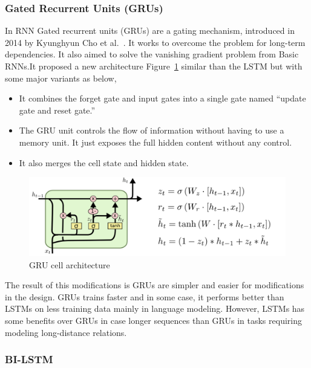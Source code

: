 \subsubsection{Gated Recurrent Units (GRUs)}

In RNN Gated recurrent units (GRUs) are a gating mechanism, introduced in 2014 by Kyunghyun Cho et al.~\cite{Cho_et_al}. It works to overcome the problem for long-term dependencies. It also aimed to solve the vanishing gradient problem from Basic RNNs.It proposed a new architecture Figure~\ref{fig:GRU} similar than the LSTM but with some major variants as below,
\begin{itemize}
  
\item It combines the forget gate and input gates into a single gate named “update gate and reset gate.”
\item The GRU unit controls the flow of information without having to use a memory unit. It just exposes the full hidden content without any control.
\item It also merges the cell state and hidden state.
  
\end{itemize}%
\begin{figure}[!t]
  \centering
  \includegraphics[scale=0.6]{./Figures/Ch_2_Background/GRU.png}
        \caption{GRU cell architecture~\cite{colah}}
        \label{fig:GRU}
      \end{figure}%
The result of this modifications is GRUs are simpler and easier for modifications in the design. GRUs trains faster and in some case, it performs better than LSTMs on less training data mainly in language modeling. However, LSTMs has some benefits over GRUs in case longer sequences than GRUs in tasks requiring modeling long-distance relations. 


 
\subsubsection{BI-LSTM}\label{sec:Bi_Lstm}

